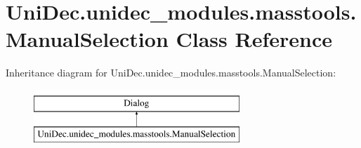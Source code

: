 \hypertarget{class_uni_dec_1_1unidec__modules_1_1masstools_1_1_manual_selection}{}\section{Uni\+Dec.\+unidec\+\_\+modules.\+masstools.\+Manual\+Selection Class Reference}
\label{class_uni_dec_1_1unidec__modules_1_1masstools_1_1_manual_selection}
Inheritance diagram for Uni\+Dec.\+unidec\+\_\+modules.\+masstools.\+Manual\+Selection\+:\begin{figure}[H]
\begin{center}
\leavevmode
\includegraphics[height=2.000000cm]{class_uni_dec_1_1unidec__modules_1_1masstools_1_1_manual_selection}
\end{center}
\end{figure}
